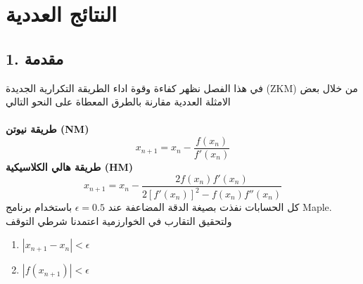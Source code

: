 \chapter{النتائج العددية}

\section*{1. مقدمة}
في هذا الفصل نظهر كفاءة وقوة اداء الطريقة التكرارية الجديدة (ZKM) من خلال بعض الامثلة العددية مقارنة بالطرق المعطاة على النحو التالي\\ \\
\textbf{طريقة نيوتن (NM)}
\[
x_{n+1} = x_n - \frac{f(x_n)}{f'(x_n)}
\]
\textbf{طريقة هالي الكلاسيكية (HM)}
\[
x_{n+1} = x_n - \frac{2f(x_n) f'(x_n)}{2[f'(x_n)]^2 - f(x_n )f''(x_n)}
\]
كل الحسابات نفذت بصيغة الدقة المضاعفة عند $\epsilon = 0.5$ باستخدام برنامج Maple. ولتحقيق التقارب في الخوارزمية اعتمدنا شرطي التوقف
\begin{enumerate}
	\item $|x_{n+1}-x_n|<\epsilon$
	\item $|f(x_{n+1})|<\epsilon$
\end{enumerate}
\newpage

